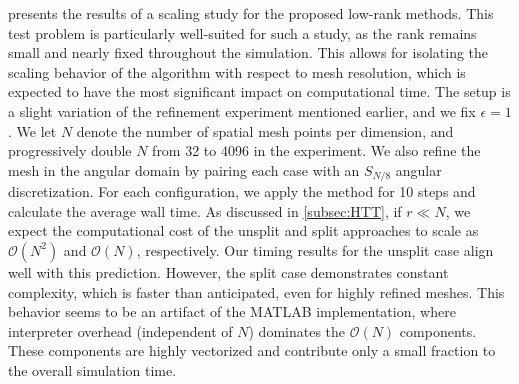 \documentclass[onefignum,onetabnum]{siamart220329}
\begin{document}

 presents the results of a scaling study for the proposed low-rank methods. This test problem is particularly well-suited for such a study, as the rank remains small and nearly fixed throughout the simulation. This allows for isolating the scaling behavior of the algorithm with respect to mesh resolution, which is expected to have the most significant impact on computational time. The setup is a slight variation of the refinement experiment mentioned earlier, and we fix $\epsilon = 1$. We let $N$ denote the number of spatial mesh points per dimension, and progressively double $N$ from 32 to 4096 in the experiment. We also refine the mesh in the angular domain by pairing each case with an $S_{N/8}$ angular discretization. For each configuration, we apply the method for 10 steps and calculate the average wall time. As discussed in \cref{subsec:HTT}, if $r \ll N$, we expect the computational cost of the unsplit and split approaches to scale as $\mathcal{O}(N^{2})$ and $\mathcal{O}(N)$, respectively. Our timing results for the unsplit case align well with this prediction. However, the split case demonstrates constant complexity, which is faster than anticipated, even for highly refined meshes. This behavior seems to be an artifact of the MATLAB implementation, where interpreter overhead (independent of $N$) dominates the $\mathcal{O}(N)$ components. These components are highly vectorized and contribute only a small fraction to the overall simulation time.   
\end{document}
